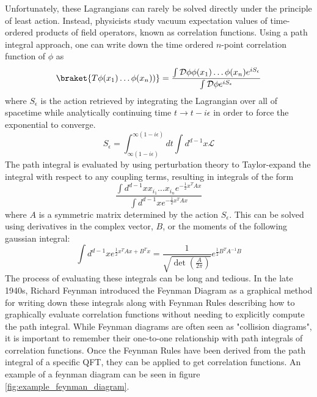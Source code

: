 Unfortunately, these Lagrangians can rarely be solved directly under the principle of least action. Instead, physicists study vacuum expectation values of time-ordered products of field operators, known as correlation functions. Using a path integral approach, one can write down the time ordered $n$-point correlation function of $\phi$ as
\begin{equation}
\braket{T \phi(x_{1}) \dots  \phi({x_{n}}))} = \frac{\int \mathcal{D}\phi \phi(x_{1}) \dots  \phi({x_{n}}) e^{iS_{\epsilon}}}{\int \mathcal{D}\phi e^{iS_{\epsilon}}}
\end{equation}
where $S_\epsilon$ is the action retrieved by integrating the Lagrangian over all of spacetime while analytically continuing time $t \to t - i\epsilon$ in order to force the exponential to converge. 
\begin{equation}
S_{\epsilon} = \int^{\infty(1-i\epsilon)}_{\infty(1-i\epsilon)} dt \int d^{d-1} x \mathcal{L}
\end{equation}
The path integral is evaluated by using perturbation theory to Taylor-expand the integral with respect to any coupling terms, resulting in integrals of the form 
\begin{equation}
\frac{\int d^{d-1}x x_{i_{1}}\dots x_{i_{n}} e^{-\frac{1}{2}x^TAx}}{\int d^{d-1}x  e^{-\frac{1}{2}x^TAx}}
\end{equation}
where $A$ is a symmetric matrix determined by the action $S_\epsilon$. This can be solved using derivatives in the complex vector, $B$, or the moments of the following gaussian integral:
\begin{equation}
\int d^{d-1} x e^{\frac{1}{2}x^TAx + B^Tx} = \frac{1}{\sqrt{ \det\left( \frac{A}{2\pi}\right) } } e^{\frac{1}{2}B^T A^{-1} B}
\end{equation}
The process of evaluating these integrals can be long and tedious. In the late 1940s, Richard Feynman introduced the Feynman Diagram as a graphical method for writing down these integrals along with Feynman Rules describing how to graphically evaluate correlation functions without needing to explicitly compute the path integral. While Feynman diagrams are often seen as "collision diagrams", it is important to remember their one-to-one relationship with path integrals of correlation functions. Once the Feynman Rules have been derived from the path integral of a specific QFT, they can be applied to get correlation functions. An example of a feynman diagram can be seen in figure \ref{fig:example_feynman_diagram}.

